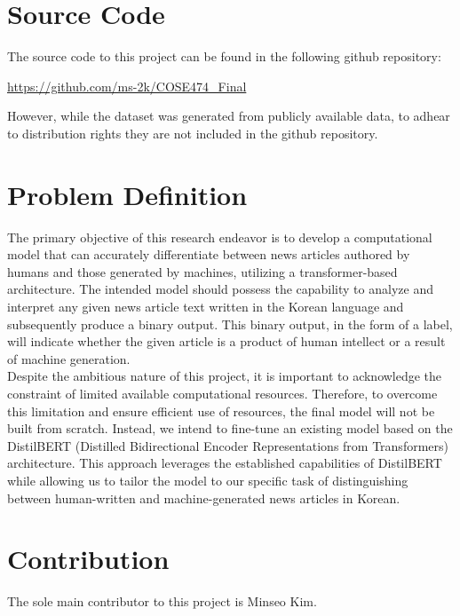 \documentclass{article}
\begin{document}
\section{Source Code}
\null\quad The source code to this project can be found in the following github repository:
\begin{center} \url{https://github.com/ms-2k/COSE474_Final} \end{center}
\null\quad However, while the dataset was generated from publicly available data, to adhear to distribution rights they are not included in the github repository.

\section{Problem Definition}
\null\quad The primary objective of this research endeavor is to develop a computational model that can accurately differentiate between news articles authored by humans and those generated by machines, utilizing a transformer-based architecture.
The intended model should possess the capability to analyze and interpret any given news article text written in the Korean language and subsequently produce a binary output.
This binary output, in the form of a label, will indicate whether the given article is a product of human intellect or a result of machine generation. \\
\null\quad Despite the ambitious nature of this project, it is important to acknowledge the constraint of limited available computational resources.
Therefore, to overcome this limitation and ensure efficient use of resources, the final model will not be built from scratch.
Instead, we intend to fine-tune an existing model based on the DistilBERT (Distilled Bidirectional Encoder Representations from Transformers) architecture.
This approach leverages the established capabilities of DistilBERT while allowing us to tailor the model to our specific task of distinguishing between human-written and machine-generated news articles in Korean.

\section{Contribution}
\null\quad The sole main contributor to this project is Minseo Kim.
\end{document}
